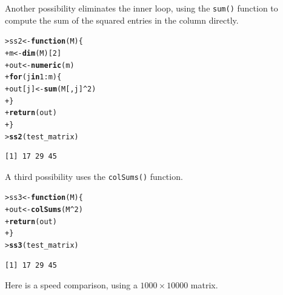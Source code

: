 \documentclass[12pt,oneside]{book}\usepackage[]{graphicx}\usepackage[]{color}
\makeatletter
\newcommand{\hlnum}[1]{\textcolor[rgb]{0.686,0.059,0.569}{#1}}%
\newcommand{\hlopt}[1]{\textcolor[rgb]{0,0,0}{#1}}%
\newcommand{\hlstd}[1]{\textcolor[rgb]{0.345,0.345,0.345}{#1}}%
\newcommand{\hlkwa}[1]{\textcolor[rgb]{0.161,0.373,0.58}{\textbf{#1}}}%
\newcommand{\hlkwb}[1]{\textcolor[rgb]{0.69,0.353,0.396}{#1}}%
\newcommand{\hlkwc}[1]{\textcolor[rgb]{0.333,0.667,0.333}{#1}}%
\newcommand{\hlkwd}[1]{\textcolor[rgb]{0.737,0.353,0.396}{\textbf{#1}}}%
\newenvironment{kframe}{%
 \def\at@end@of@kframe{}%
 \ifinner\ifhmode%
  \def\at@end@of@kframe{\end{minipage}}%
  \begin{minipage}{\columnwidth}%
 \fi\fi%
 \def\FrameCommand##1{\hskip\@totalleftmargin \hskip-\fboxsep
 \colorbox{shadecolor}{##1}\hskip-\fboxsep
     \hskip-\linewidth \hskip-\@totalleftmargin \hskip\columnwidth}%
 \MakeFramed {\advance\hsize-\width
   \@totalleftmargin\z@ \linewidth\hsize
   \@setminipage}}%
 {\par\unskip\endMakeFramed%
 \at@end@of@kframe}
\newenvironment{knitrout}{}{} %
\makeatother
\begin{document}
Another possibility eliminates the inner loop, using the \verb+sum()+ function to compute the sum of the squared entries in the column directly. 
\begin{knitrout}
\color{fgcolor}\begin{kframe}
\begin{alltt}
\hlstd{> }\hlstd{ss2} \hlkwb{<-} \hlkwa{function}\hlstd{(}\hlkwc{M}\hlstd{) \{}
\hlstd{+ }    \hlstd{m} \hlkwb{<-} \hlkwd{dim}\hlstd{(M)[}\hlnum{2}\hlstd{]}
\hlstd{+ }    \hlstd{out} \hlkwb{<-} \hlkwd{numeric}\hlstd{(m)}
\hlstd{+ }    \hlkwa{for} \hlstd{(j} \hlkwa{in} \hlnum{1}\hlopt{:}\hlstd{m) \{}
\hlstd{+ }        \hlstd{out[j]} \hlkwb{<-} \hlkwd{sum}\hlstd{(M[, j]}\hlopt{^}\hlnum{2}\hlstd{)}
\hlstd{+ }    \hlstd{\}}
\hlstd{+ }    \hlkwd{return}\hlstd{(out)}
\hlstd{+ }\hlstd{\}}
\hlstd{> }\hlkwd{ss2}\hlstd{(test_matrix)}
\end{alltt}
\begin{verbatim}
[1] 17 29 45
\end{verbatim}
\end{kframe}
\end{knitrout}
A third possibility uses the \verb+colSums()+ function.
\begin{knitrout}
\color{fgcolor}\begin{kframe}
\begin{alltt}
\hlstd{> }\hlstd{ss3} \hlkwb{<-} \hlkwa{function}\hlstd{(}\hlkwc{M}\hlstd{) \{}
\hlstd{+ }    \hlstd{out} \hlkwb{<-} \hlkwd{colSums}\hlstd{(M}\hlopt{^}\hlnum{2}\hlstd{)}
\hlstd{+ }    \hlkwd{return}\hlstd{(out)}
\hlstd{+ }\hlstd{\}}
\hlstd{> }\hlkwd{ss3}\hlstd{(test_matrix)}
\end{alltt}
\begin{verbatim}
[1] 17 29 45
\end{verbatim}
\end{kframe}
\end{knitrout}
Here is a speed comparison, using a $1000\times 10000$ matrix.
\end{document}
